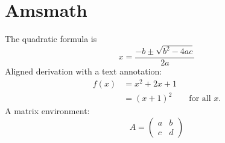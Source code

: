 \documentclass{article}
\begin{document}
\section{Amsmath}
The quadratic formula is
\begin{equation}
  x = \frac{-b \pm \sqrt{b^2-4ac}}{2a}
\end{equation}
Aligned derivation with a text annotation:
\begin{align}
  f(x) &= x^2 + 2x + 1 \\
       &= (x+1)^2 \qquad \text{for all } x.
\end{align}
A matrix environment:
\begin{equation}
  A = \begin{pmatrix} a & b \\ c & d \end{pmatrix}
\end{equation}
\end{document}

